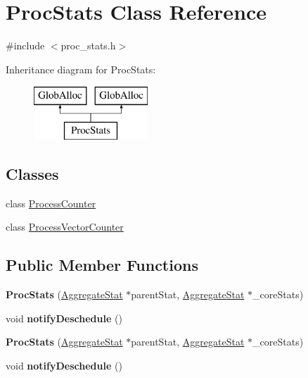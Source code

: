 \hypertarget{classProcStats}{\section{Proc\-Stats Class Reference}
\label{classProcStats}
}


{\ttfamily \#include $<$proc\-\_\-stats.\-h$>$}

Inheritance diagram for Proc\-Stats\-:\begin{figure}[H]
\begin{center}
\leavevmode
\includegraphics[height=2.000000cm]{classProcStats}
\end{center}
\end{figure}
\subsection*{Classes}
\begin{DoxyCompactItemize}
\item 
class \hyperlink{classProcStats_1_1ProcessCounter}{Process\-Counter}
\item 
class \hyperlink{classProcStats_1_1ProcessVectorCounter}{Process\-Vector\-Counter}
\end{DoxyCompactItemize}
\subsection*{Public Member Functions}
\begin{DoxyCompactItemize}
\item 
\hypertarget{classProcStats_a0c4b3a5811b28b7fea529b7c7173d6b1}{{\bfseries Proc\-Stats} (\hyperlink{classAggregateStat}{Aggregate\-Stat} $\ast$parent\-Stat, \hyperlink{classAggregateStat}{Aggregate\-Stat} $\ast$\-\_\-core\-Stats)}\label{classProcStats_a0c4b3a5811b28b7fea529b7c7173d6b1}

\item 
\hypertarget{classProcStats_aded6d74ec1487c3d0cd795f774bc8b54}{void {\bfseries notify\-Deschedule} ()}\label{classProcStats_aded6d74ec1487c3d0cd795f774bc8b54}

\item 
\hypertarget{classProcStats_a0c4b3a5811b28b7fea529b7c7173d6b1}{{\bfseries Proc\-Stats} (\hyperlink{classAggregateStat}{Aggregate\-Stat} $\ast$parent\-Stat, \hyperlink{classAggregateStat}{Aggregate\-Stat} $\ast$\-\_\-core\-Stats)}\label{classProcStats_a0c4b3a5811b28b7fea529b7c7173d6b1}

\item 
\hypertarget{classProcStats_aded6d74ec1487c3d0cd795f774bc8b54}{void {\bfseries notify\-Deschedule} ()}\label{classProcStats_aded6d74ec1487c3d0cd795f774bc8b54}

\end{DoxyCompactItemize}


